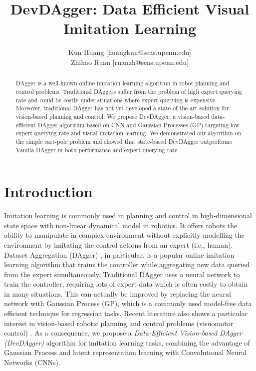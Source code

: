 \documentclass[11pt, reqno, letterpaper, twoside]{amsart}
\title{DevDAgger: Data Efficient Visual Imitation Learning}
\author{ Kun Huang [huangkun@seas.upenn.edu]\\
Zhihao Ruan [ruanzh@seas.upenn.edu] \\
}
\begin{document}

\begin{abstract}
	DAgger is a well-known online imitation learning algorithm in robot planning
	and control problems. Traditional DAggers suffer from the problem of high
	expert querying rate and could be costly under situations where expert
	querying is expensive. Moreover, traditional DAgger has not yet developed a
	state-of-the-art solution for vision-based planning and control. We propose
	DevDAgger, a vision-based data-efficient DAgger algorithm based on CNN and
	Gaussian Processes (GP) targeting low expert querying rate and visual
	imitation learning. We demonstrated our algorithm on the simple cart-pole
	problem and showed that state-based DevDAgger outperforms Vanilla DAgger in
	both performance and expert querying rate.
\end{abstract}

\maketitle

\section{Introduction}
Imitation learning is commonly used in planning and control in high-dimensional
state space with non-linear dynamical model in robotics. It offers robots the
ability to manipulate in complex environment without explicitly modelling the
environment by imitating the control actions from an expert (i.e., human).
Dataset Aggregation (DAgger) \cite{dagger}, in particular, is a popular online
imitation learning algorithm that trains the controller while aggregating new
data queried from the expert simultaneously. Traditional DAgger uses a neural
network to train the controller, requiring lots of expert data which is often
costly to obtain in many situations. This can actually be improved by replacing
the neural network with Gaussian Process (GP), which is a commonly used
model-free data efficient technique for regression tasks. Recent literature also
shows a particular interest in vision-based robotic planning and control
problems (visuomotor control) \cite{vision-based-RL,ebert2018visual,xie2018few}.
As a consequence, we propose a \emph{Data-Efficient Vision-based DAgger
	(DevDAgger)} algorithm for imitation learning tasks, combining the advantage of
Gaussian Process and latent representation learning with Convolutional Neural
Networks (CNNs).
\end{document}
